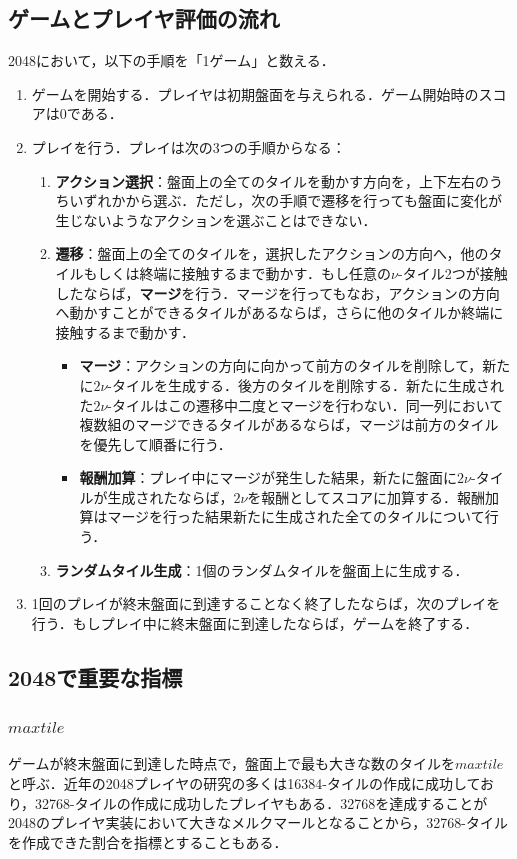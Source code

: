 \documentclass{suribt}
\begin{document}
\subsection{ゲームとプレイヤ評価の流れ}
2048において，以下の手順を「1ゲーム」と数える．

\begin{enumerate}
\item ゲームを開始する．プレイヤは初期盤面を与えられる．ゲーム開始時のスコアは0である．
\item プレイを行う．プレイは次の3つの手順からなる：
	\begin{enumerate}
	\item \textbf{アクション選択}：盤面上の全てのタイルを動かす方向を，上下左右のうちいずれかから選ぶ．ただし，次の手順で遷移を行っても盤面に変化が生じないようなアクションを選ぶことはできない．
	\item \textbf{遷移}：盤面上の全てのタイルを，選択したアクションの方向へ，他のタイルもしくは終端に接触するまで動かす．もし任意の${\nu}$-タイル2つが接触したならば，\textbf{マージ}を行う．マージを行ってもなお，アクションの方向へ動かすことができるタイルがあるならば，さらに他のタイルか終端に接触するまで動かす．
	\begin{itemize}
		\item \textbf{マージ}：アクションの方向に向かって前方のタイルを削除して，新たに$2{\nu}$-タイルを生成する．後方のタイルを削除する．新たに生成された$2{\nu}$-タイルはこの遷移中二度とマージを行わない．同一列において複数組のマージできるタイルがあるならば，マージは前方のタイルを優先して順番に行う．
		\item \textbf{報酬加算}：プレイ中にマージが発生した結果，新たに盤面に$2{\nu}$-タイルが生成されたならば，$2{\nu}$を報酬としてスコアに加算する．報酬加算はマージを行った結果新たに生成された全てのタイルについて行う．
	\end{itemize}
	\item \textbf{ランダムタイル生成}：1個のランダムタイルを盤面上に生成する．
	\end{enumerate}
\item 1回のプレイが終末盤面に到達することなく終了したならば，次のプレイを行う．もしプレイ中に終末盤面に到達したならば，ゲームを終了する．
\end{enumerate}

\subsection{2048で重要な指標}
\subsubsection{$max tile$}
ゲームが終末盤面に到達した時点で，盤面上で最も大きな数のタイルを$max tile$と呼ぶ．近年の2048プレイヤの研究の多くは16384-タイルの作成に成功しており，32768-タイルの作成に成功したプレイヤもある\cite{Jaskowski}．32768を達成することが2048のプレイヤ実装において大きなメルクマールとなることから，32768-タイルを作成できた割合を指標とすることもある\cite{Jaskowski}．
\end{document}
